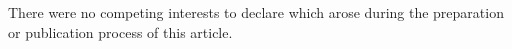 \documentclass{aptpub}
\begin{document}
\competing %
\noindent There were no competing interests to declare which arose during the preparation or publication process of this article.









%
%
%
%



\end{document}
